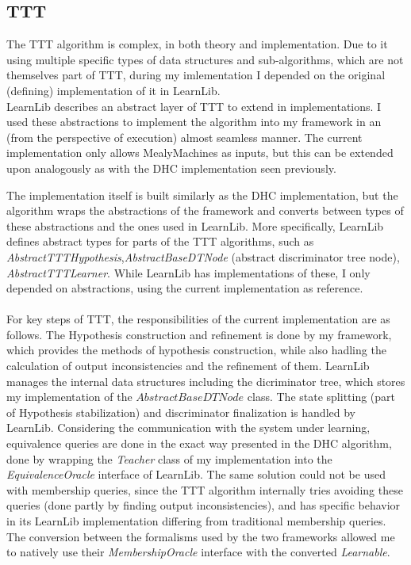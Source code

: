 \subsection{TTT}

The TTT algorithm is complex, in both theory and implementation. Due to it using multiple specific types of data structures and sub-algorithms, which are not themselves part of TTT, during my imlementation I depended on the original (defining) implementation of it in LearnLib\cite{10.1007/978-3-319-21690-4_32}.
\\
LearnLib describes an abstract layer of TTT to extend in implementations. I used these abstractions to implement the algorithm into my framework in an (from the perspective of execution) almost seamless manner. The current implementation only allows MealyMachines as inputs, but this can be extended upon analogously as with the DHC implementation seen previously.

The implementation itself is built similarly as the DHC implementation, but the algorithm wraps the abstractions of the framework and converts between types of these abstractions and the ones used in LearnLib. More specifically, LearnLib defines abstract types for parts of the TTT algorithms, such as \emph{AbstractTTTHypothesis},\emph{AbstractBaseDTNode} (abstract discriminator tree node), \emph{AbstractTTTLearner}. While LearnLib has implementations of these, I only depended on abstractions, using the current implementation as reference.
\\\\
For key steps of TTT, the responsibilities of the current implementation are as follows. The Hypothesis construction and refinement is done by my framework, which provides the methods of hypothesis construction, while also hadling the calculation of output inconsistencies and the refinement of them. LearnLib manages the internal data structures including the dicriminator tree, which stores my implementation of the $AbstractBaseDTNode$ class. The state splitting (part of Hypothesis stabilization) and discriminator finalization is handled by LearnLib. Considering the communication with the system under learning, equivalence queries are done in the exact way presented in the DHC algorithm, done by wrapping the \emph{Teacher} class of my implementation into the \emph{EquivalenceOracle} interface of LearnLib. The same solution could not be used with membership queries, since the TTT algorithm internally tries avoiding these queries (done partly by finding output inconsistencies), and has specific behavior in its LearnLib implementation differing from traditional membership queries. The conversion between the formalisms used by the two frameworks allowed me to natively use their \emph{MembershipOracle} interface with the converted \emph{Learnable}.



